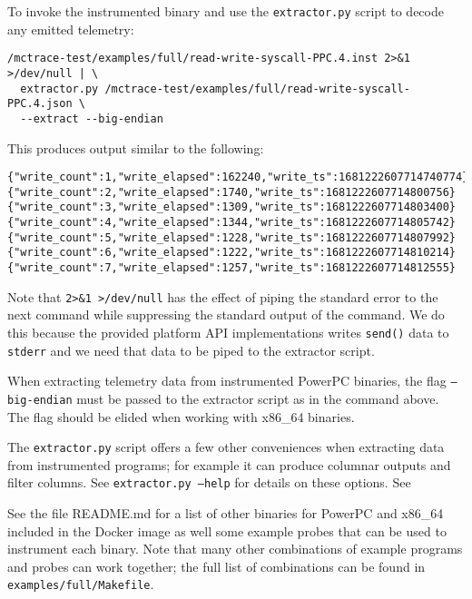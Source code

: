 To invoke the instrumented binary and use the \texttt{extractor.py} script to
decode any emitted telemetry:
\begin{verbatim}
/mctrace-test/examples/full/read-write-syscall-PPC.4.inst 2>&1
>/dev/null | \
  extractor.py /mctrace-test/examples/full/read-write-syscall-PPC.4.json \
  --extract --big-endian
\end{verbatim}
This produces output similar to the following:
\begin{verbatim}
{"write_count":1,"write_elapsed":162240,"write_ts":1681222607714740774} 
{"write_count":2,"write_elapsed":1740,"write_ts":1681222607714800756} 
{"write_count":3,"write_elapsed":1309,"write_ts":1681222607714803400} 
{"write_count":4,"write_elapsed":1344,"write_ts":1681222607714805742} 
{"write_count":5,"write_elapsed":1228,"write_ts":1681222607714807992} 
{"write_count":6,"write_elapsed":1222,"write_ts":1681222607714810214} 
{"write_count":7,"write_elapsed":1257,"write_ts":1681222607714812555} 
\end{verbatim}

Note that \texttt{2>\&1 >/dev/null} has the effect of piping the standard
  error to the next command while suppressing the standard output of the
  command. We do this because the provided platform API implementations
  writes \texttt{send()} data to \texttt{stderr} and we need that data to be piped to
  the extractor script.

When extracting telemetry data from instrumented PowerPC binaries, the
  flag \texttt{--big-endian} must be passed to the extractor script as in the
  command above. The flag should be elided when working with x86\_64
  binaries.

The \texttt{extractor.py} script offers a few other conveniences when
  extracting data from instrumented programs; for example it can produce
  columnar outputs and filter columns. See \texttt{extractor.py --help} for
  details on these options.  See 

See the file README.md for a list of other binaries for PowerPC and
x86\_64 included 
  in the Docker image as well some example probes that can be used to
  instrument each binary. Note that many other combinations of example
  programs and probes can work together; the full list of combinations
  can be found in \texttt{examples/full/Makefile}.
  
